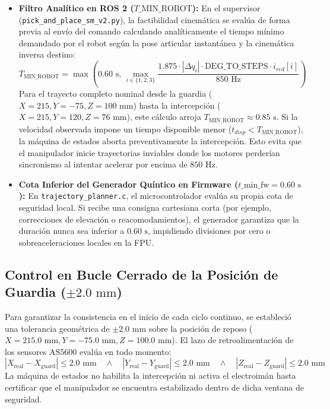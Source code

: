 \documentclass[12pt, a4paper]{report}
\begin{document}
\begin{itemize}
    \item \textbf{Filtro Analítico en ROS 2 ($T\_{\text{MIN\_ROBOT}}$):} 
    En el supervisor (\texttt{pick\_and\_place\_sm\_v2.py}), la factibilidad cinemática se evalúa de forma previa al envío del comando calculando analíticamente el tiempo mínimo demandado por el robot según la pose articular instantánea y la cinemática inversa destino:
    \begin{equation}
        T_{\text{MIN\_ROBOT}} = \max\left(0.60\text{ s}, \, \max_{i \in \{1,2,3\}} \frac{1.875 \cdot |\Delta q_i| \cdot \text{DEG\_TO\_STEPS} \cdot i_{red}[i]}{850\text{ Hz}}\right)
    \end{equation}
    Para el trayecto completo nominal desde la guardia ($X=215, Y=-75, Z=100\text{ mm}$) hasta la intercepción ($X=215, Y=120, Z=76\text{ mm}$), este cálculo arroja $T_{\text{MIN\_ROBOT}} \approx 0.85\text{ s}$. Si la velocidad observada impone un tiempo disponible menor ($t_{disp} < T_{\text{MIN\_ROBOT}}$), la máquina de estados aborta preventivamente la intercepción. Esto evita que el manipulador inicie trayectorias inviables donde los motores perderían sincronismo al intentar acelerar por encima de $850\text{ Hz}$.
    
    \item \textbf{Cota Inferior del Generador Quíntico en Firmware ($t\_{\text{min\_fw}} = 0.60\text{ s}$):} 
    En \texttt{trajectory\_planner.c}, el microcontrolador evalúa su propia cota de seguridad local. Si recibe una consigna cartesiana corta (por ejemplo, correcciones de elevación o reacomodamientos), el generador garantiza que la duración nunca sea inferior a $0.60\text{ s}$, impidiendo divisiones por cero o sobreaceleraciones locales en la FPU.
\end{itemize}

\subsection{Control en Bucle Cerrado de la Posición de Guardia ($\pm 2.0\text{ mm}$)}
Para garantizar la consistencia en el inicio de cada ciclo continuo, se estableció una tolerancia geométrica de $\pm 2.0\text{ mm}$ sobre la posición de reposo ($X = 215.0\text{ mm}, Y = -75.0\text{ mm}, Z = 100.0\text{ mm}$). El lazo de retroalimentación de los sensores AS5600 evalúa en todo momento:
\begin{equation}
    |X_{\text{real}} - X_{\text{guard}}| \le 2.0\text{ mm} \quad \wedge \quad |Y_{\text{real}} - Y_{\text{guard}}| \le 2.0\text{ mm} \quad \wedge \quad |Z_{\text{real}} - Z_{\text{guard}}| \le 2.0\text{ mm}
\end{equation}
La máquina de estados no habilita la intercepción ni activa el electroimán hasta certificar que el manipulador se encuentra estabilizado dentro de dicha ventana de seguridad.
\end{document}
